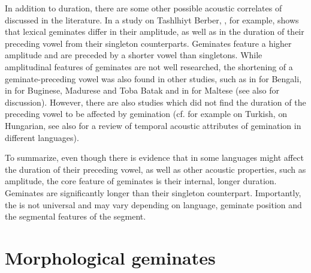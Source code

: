 In addition to duration, there are some other possible acoustic correlates of  discussed in the literature. In a study on Tashlhiyt Berber, \cite{Ridouane.2010}, for example, shows  that {lexical geminates} differ in their  amplitude, as well as in the duration of their preceding vowel from their singleton counterparts. Geminates feature a higher amplitude and are preceded by a shorter vowel than singletons. While amplitudinal features of {geminates} are not well researched,  the shortening of a geminate-preceding vowel was also found in other studies, such as in \cite{Lahiri.1988} for Bengali, in \cite{Cohn.1999} for Buginese, Madurese and Toba Batak and in  \cite{Galea.2016} for Maltese (see also \citealt{Maddieson.1985} for discussion). However, there are also studies which did not find the duration of the preceding vowel to be affected by {gemination} (cf. for example \citealt{Lahiri.1988} on Turkish, \citealt{Ham.2001} on Hungarian, see also \citealt[6]{Ridouane.2010} for a review of temporal acoustic attributes of {gemination} in different languages).

To summarize, even though there is evidence that in some languages  might affect the duration of their preceding vowel, as well as other acoustic properties, such as amplitude, the core feature of {geminates} is their internal, longer duration. Geminates are significantly longer than their singleton counterpart. Importantly, the  is not universal and may vary depending on language, {geminate} position and the segmental features of the segment.



\section{Morphological geminates}\label{Morphological Gemination}

